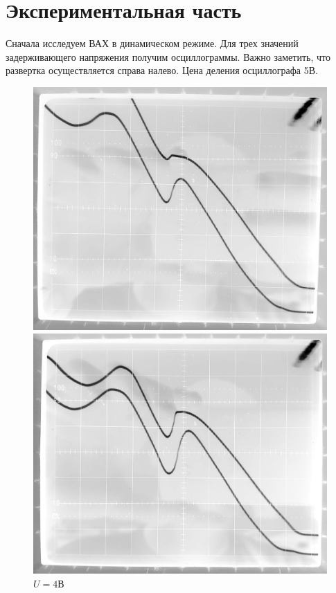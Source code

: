 \documentclass[a4paper, 12pt]{article}
\begin{document}
	\section{Экспериментальная часть}
		Сначала исследуем ВАХ в динамическом режиме. Для трех значений задерживающего напряжения получим осциллограммы. Важно заметить, что развертка осуществляется справа налево. Цена деления осциллографа 5В.
	\begin{figure}[h!]
			\includegraphics[width=\linewidth]{20181011_100150.jpg}
			\caption{$U=4$В}
		\endminipage\hfill
			\includegraphics[width=\linewidth]{20181011_100218.jpg}

\end{figure}
\end{document}

